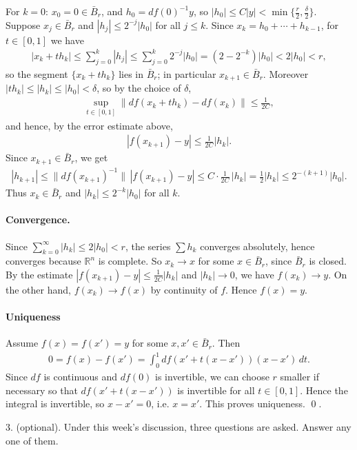 For $k=0$: $x_0=0\in\bar B_r$, and $h_0=df(0)^{-1}y$, so $|h_0|\le C|y|<\min\{\frac{r}{2},\frac{\delta}{2}\}$. Suppose $x_j\in\bar B_r$ and $|h_j|\le 2^{-j}|h_0|$ for all $j\le k$. Since $x_k=h_0+\cdots+h_{k-1}$,
for $t\in[0,1]$ we have
\begin{align}
    |x_k+th_k| \le \sum_{j=0}^{k}|h_j| \le \sum_{j=0}^{k}2^{-j}|h_0| = (2-2^{-k})|h_0| < 2|h_0| < r,
\end{align}
so the segment $\{x_k+th_k\}$ lies in $\bar B_r$; in particular $x_{k+1}\in\bar B_r$.
Moreover $|th_k|\le|h_k|\le|h_0|<\delta$, so by the choice of $\delta$,
\begin{align}
    \sup_{t\in[0,1]}\|df(x_k+th_k)-df(x_k)\|\le\frac{1}{2C},
\end{align}
and hence, by the error estimate above,
\begin{align}
    |f(x_{k+1})-y|\le\frac{1}{2C}|h_k|.
\end{align}
Since $x_{k+1}\in\bar B_r$, we get
\begin{align}
    |h_{k+1}| \le \|df(x_{k+1})^{-1}\|\,|f(x_{k+1})-y| \le C\cdot\frac{1}{2C}\,|h_k| = \frac{1}{2}|h_k| \le 2^{-(k+1)}|h_0|.
\end{align}
Thus $x_k\in\bar B_r$ and $|h_k|\le 2^{-k}|h_0|$ for all $k$.

\paragraph{Convergence.} Since $\sum_{k=0}^{\infty}|h_k|\le 2|h_0|<r$, the series $\sum h_k$ converges absolutely, hence converges because $\mathbb{R}^n$ is complete. So $x_k\to x$ for some $x\in\bar B_r$, since $\bar B_r$ is closed. By the estimate $|f(x_{k+1})-y|\le\frac{1}{2C}|h_k|$ and $|h_k|\to 0$, we have $f(x_k)\to y$. On the other hand, $f(x_k)\to f(x)$ by continuity of $f$. Hence $f(x)=y$.

\paragraph{Uniqueness} Assume $f(x)=f(x')=y$ for some $x,x'\in\bar B_r$. Then
\begin{align}
    0 = f(x)-f(x') = \int_0^1 df(x'+t(x-x'))(x-x')\,dt.
\end{align}
Since $df$ is continuous and $df(0)$ is invertible, we can choose $r$ smaller if necessary so that $df(x'+t(x-x'))$ is invertible for all $t\in[0,1]$. Hence the integral is invertible, so $x-x'=0$, i.e. $x=x'$. This proves uniqueness. \qed.





\clearpage
{}
3. (optional). Under this week's discussion, three questions are asked. Answer any one of them.
\answer{}